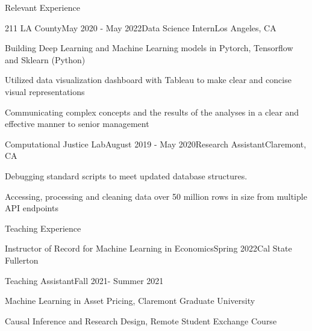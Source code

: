\documentclass{resume} %
\begin{document}
\begin{rSection}{Relevant Experience}
\begin{rSubsection}{211 LA County}{May 2020 - May 2022}{Data Science Intern}{Los Angeles, CA}
\item Building Deep Learning and Machine Learning models in Pytorch,
Tensorflow and Sklearn (Python)
\item Utilized data visualization dashboard with Tableau to make clear and concise visual representations

\item Communicating complex concepts and the results of the analyses in a clear and effective manner to senior management
\end{rSubsection}
\begin{rSubsection}{Computational Justice Lab}{August 2019 - May 2020}{Research Assistant}{Claremont, CA}
\item Debugging standard scripts to meet updated database
structures.
\item Accessing, processing and cleaning data over 50 million rows in size from multiple API endpoints
\end{rSubsection}
\end{rSection}

\begin{rSection}{Teaching Experience}
\begin{rSubsection}{Instructor of Record for Machine Learning in Economics}{Spring 2022}{Cal State Fullerton}{}



\vspace{-.1cm}
\vspace{-0.7cm}
\item[]
\end{rSubsection}

\begin{rSubsection}{Teaching Assistant}{Fall 2021- Summer 2021}{}{}

\item Machine Learning in Asset Pricing, Claremont Graduate University
\item Causal Inference and Research Design, Remote Student Exchange Course

\vspace{-0.7cm}
\item[]
\end{rSubsection}
\end{rSection}
\end{document}
